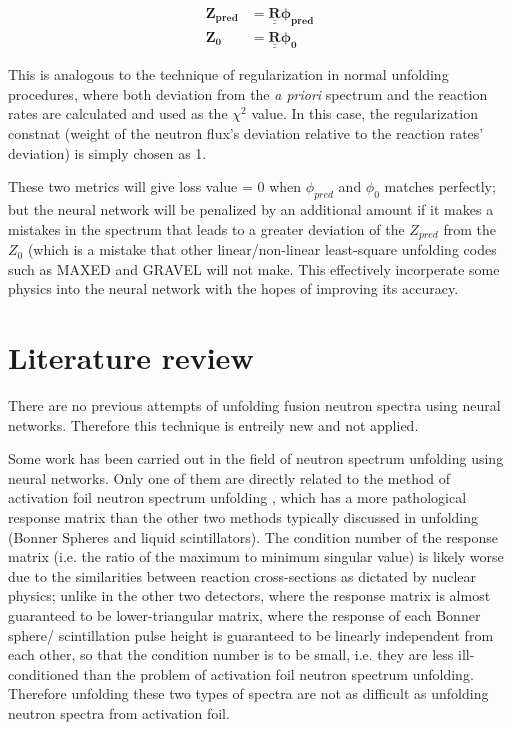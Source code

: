 \documentclass[a4paper, 12pt]{article}
\newcommand{\matr}[1]{\underline{\underline{\textbf{#1}}}}
\newcommand{\ve}[1]{\boldsymbol{#1}}
\begin{document}
    \begin{align}\label{unfolding general equation prediction}
        \ve{Z_{pred}} &= \matr{R} \ve{\phi_{pred} }\\
        \ve{Z_{0}} &= \matr{R} \ve{\phi_{0} }
    \end{align}

    This is analogous to the technique of regularization\cite{FisherRegularization} in normal unfolding procedures, where both deviation from the \emph{a priori} spectrum and the reaction rates are calculated and used as the $\chi^2$ value. In this case, the regularization constnat (weight of the neutron flux's deviation relative to the reaction rates' deviation) is simply chosen as 1.

    These two metrics will give loss value = 0 when $\phi_{pred}$ and $\phi_0$ matches perfectly; but the neural network will be penalized by an additional amount if it makes a mistakes in the spectrum that leads to a greater deviation of the $Z_{pred}$ from the $Z_{0}$ (which is a mistake that other linear/non-linear least-square unfolding codes such as MAXED and GRAVEL will not make. This effectively incorperate some physics into the neural network with the hopes of improving its accuracy.

\section{Literature review}\label{Literature review}
There are no previous attempts of unfolding fusion neutron spectra using neural networks. Therefore this technique is entreily new and not applied.

Some work has been carried out in the field of neutron spectrum unfolding using neural networks. Only one of them are directly related to the method of activation foil neutron spectrum unfolding \cite{Accelerator-basedANNUnfolding}, which has a more pathological response matrix than the other two methods typically discussed in unfolding (Bonner Spheres and liquid scintillators). The condition number of the response matrix (i.e. the ratio of the maximum to minimum singular value\cite{MATLAB}) is likely worse due to the similarities between reaction cross-sections as dictated by nuclear physics; unlike in the other two detectors, where the response matrix is almost guaranteed to be lower-triangular matrix, where the response of each Bonner sphere/ scintillation pulse height is guaranteed to be linearly independent from each other, so that the condition number is to be small, i.e. they are less ill-conditioned than the problem of activation foil neutron spectrum unfolding. Therefore unfolding these two types of spectra are not as difficult as unfolding neutron spectra from activation foil.
\end{document}
